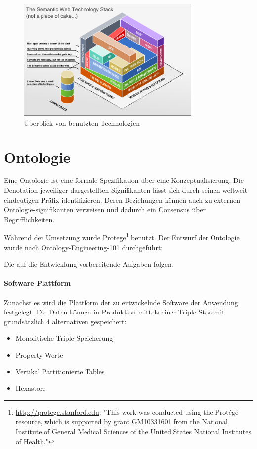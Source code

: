 \documentclass[
12pt,
english,
ngerman,
headsepline,
twoside,
openright,
numbers=noenddot,version=first
]{scrreprt}
\begin{document}
\begin{figure}[h]
	\centering
	\includegraphics[width=0.8\textwidth]{pics/semantic_web_technology_stack.png}
	\caption{Überblick von benutzten Technologien}
	\label{fig:semantic-web-stack}
\end{figure}

\section{Ontologie}
\label{subsec:ontology}
Eine Ontologie ist eine formale Spezifikation über eine Konzeptualisierung\cite{OntoWhat}. Die Denotation jeweiliger dargestellten Signifikanten lässt sich durch seinen weltweit eindeutigen Präfix identifizieren. Deren Beziehungen können auch zu externen Ontologie-signifikanten verweisen und dadurch ein Consensus über Begrifflichkeiten. 

Während der Umsetzung wurde Protege\footnote{\url{http://protege.stanford.edu}: "This work was conducted using the Protégé resource, which is supported by grant GM10331601 from the National Institute of General Medical Sciences of the United States National Institutes of Health."} benutzt.
Der Entwurf der Ontologie wurde nach Ontology-Engineering-101 durchgeführt:

Die auf die Entwicklung vorbereitende Aufgaben folgen.

\paragraph{Software Plattform} Zunächst es wird die Plattform der zu entwickelnde Software der Anwendung festgelegt.
Die Daten können in Produktion mittels einer \glqq Triple-Store\grqq mit grundsätzlich 4 alternativen gespeichert:
\begin{itemize}
	\item Monolitische Triple Speicherung
	\item Property Werte
	\item Vertikal Partitionierte Tables
	\item Hexastore
\end{itemize}
\end{document}
